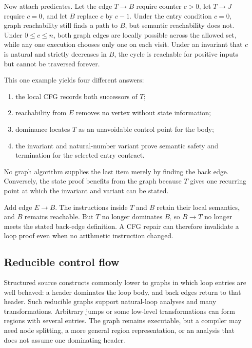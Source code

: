 Now attach predicates. Let the edge \(T\to B\) require counter \(c>0\), let
\(T\to J\) require \(c=0\), and let \(B\) replace \(c\) by \(c-1\). Under
the entry condition \(c=0\), graph reachability still finds a path to \(B\),
but semantic reachability does not. Under \(0\le c\le n\), both graph edges
are locally possible across the allowed set, while any one execution chooses
only one on each visit. Under an invariant that \(c\) is natural and strictly
decreases in \(B\), the cycle is reachable for positive inputs but cannot be
traversed forever.

This one example yields four different answers:

\begin{enumerate}
\item the local CFG records both successors of \(T\);
\item reachability from \(E\) removes no vertex without state information;
\item dominance locates \(T\) as an unavoidable control point for the body;
\item the invariant and natural-number variant prove semantic safety and
termination for the selected entry contract.
\end{enumerate}

No graph algorithm supplies the last item merely by finding the back edge.
Conversely, the state proof benefits from the graph because \(T\) gives one
recurring point at which the invariant and variant can be stated.

\begin{example}[title={Adding one edge changes dominance but not instruction meanings}]
Add edge \(E\to B\). The instructions inside \(T\) and \(B\) retain their
local semantics, and \(B\) remains reachable. But \(T\) no longer dominates
\(B\), so \(B\to T\) no longer meets the stated back-edge definition. A CFG
repair can therefore invalidate a loop proof even when no arithmetic
instruction changed.
\end{example}

\subsection{Reducible control flow}

Structured source constructs commonly lower to graphs in which loop entries
are well behaved: a header dominates the loop body, and back edges return to
that header. Such reducible graphs support natural-loop analyses and many
transformations. Arbitrary jumps or some low-level transformations can form
regions with several entries. The graph remains executable, but a compiler
may need node splitting, a more general region representation, or an analysis
that does not assume one dominating header.

